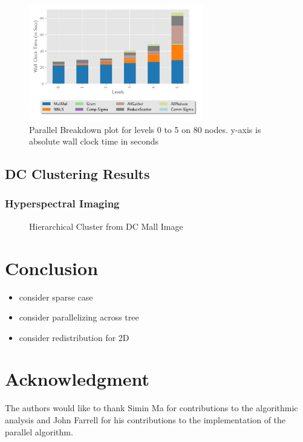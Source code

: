 \documentclass[conference,compsoc]{IEEEtran}
\begin{document}
\begin{figure}
\begin{center}
\includegraphics[height=2in, width=\columnwidth]{plots/realworld_parallel_level_breakdown.pdf}
\caption{Parallel Breakdown plot for levels 0 to 5 on 80 nodes. y-axis is absolute wall clock time in seconds}
\label{fig:rwparallellevelbreakdown}
\end{center}
\end{figure}


\subsection{DC Clustering Results}

\subsubsection{Hyperspectral Imaging}
\begin{figure}

\caption{Hierarchical Cluster from DC Mall Image}
\label{fig:dc}
\end{figure}


\section{Conclusion}

\begin{itemize}
	\item consider sparse case
	\item consider parallelizing across tree
	\item consider redistribution for 2D
\end{itemize}

\section*{Acknowledgment}

The authors would like to thank Simin Ma for contributions to the algorithmic analysis and John Farrell for his contributions to the implementation of the parallel algorithm.



\end{document}
